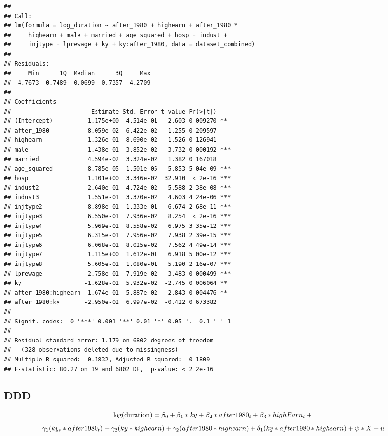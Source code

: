 \documentclass[
]{article}
\begin{document}
\begin{verbatim}
## 
## Call:
## lm(formula = log_duration ~ after_1980 + highearn + after_1980 * 
##     highearn + male + married + age_squared + hosp + indust + 
##     injtype + lprewage + ky + ky:after_1980, data = dataset_combined)
## 
## Residuals:
##     Min      1Q  Median      3Q     Max 
## -4.7673 -0.7489  0.0699  0.7357  4.2709 
## 
## Coefficients:
##                       Estimate Std. Error t value Pr(>|t|)    
## (Intercept)         -1.175e+00  4.514e-01  -2.603 0.009270 ** 
## after_1980           8.059e-02  6.422e-02   1.255 0.209597    
## highearn            -1.326e-01  8.690e-02  -1.526 0.126941    
## male                -1.438e-01  3.852e-02  -3.732 0.000192 ***
## married              4.594e-02  3.324e-02   1.382 0.167018    
## age_squared          8.785e-05  1.501e-05   5.853 5.04e-09 ***
## hosp                 1.101e+00  3.346e-02  32.910  < 2e-16 ***
## indust2              2.640e-01  4.724e-02   5.588 2.38e-08 ***
## indust3              1.551e-01  3.370e-02   4.603 4.24e-06 ***
## injtype2             8.898e-01  1.333e-01   6.674 2.68e-11 ***
## injtype3             6.550e-01  7.936e-02   8.254  < 2e-16 ***
## injtype4             5.969e-01  8.558e-02   6.975 3.35e-12 ***
## injtype5             6.315e-01  7.956e-02   7.938 2.39e-15 ***
## injtype6             6.068e-01  8.025e-02   7.562 4.49e-14 ***
## injtype7             1.115e+00  1.612e-01   6.918 5.00e-12 ***
## injtype8             5.605e-01  1.080e-01   5.190 2.16e-07 ***
## lprewage             2.758e-01  7.919e-02   3.483 0.000499 ***
## ky                  -1.628e-01  5.932e-02  -2.745 0.006064 ** 
## after_1980:highearn  1.674e-01  5.887e-02   2.843 0.004476 ** 
## after_1980:ky       -2.950e-02  6.997e-02  -0.422 0.673382    
## ---
## Signif. codes:  0 '***' 0.001 '**' 0.01 '*' 0.05 '.' 0.1 ' ' 1
## 
## Residual standard error: 1.179 on 6802 degrees of freedom
##   (328 observations deleted due to missingness)
## Multiple R-squared:  0.1832, Adjusted R-squared:  0.1809 
## F-statistic: 80.27 on 19 and 6802 DF,  p-value: < 2.2e-16
\end{verbatim}

\subsection{DDD}\label{ddd}

\[
\text{log(duration)}= \beta_0+ \beta_1*ky+ \beta_2*after1980_t+ \beta_3*highEarn_i+\\
\]
\[\gamma_1(ky_s*after1980_t)+\gamma_2(ky*highearn)+ \gamma_2(after1980*highearn)+\\
\delta_1(ky*after1980*highearn)+ \psi*{X}+ u\]
\end{document}
